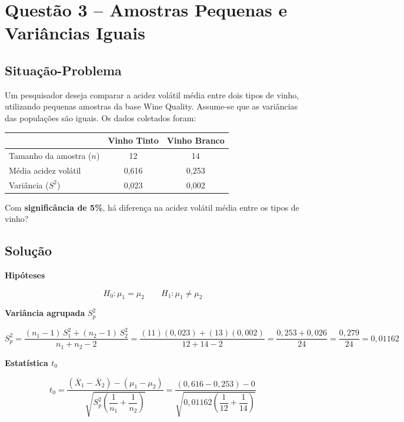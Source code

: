 \documentclass[12pt,a4paper]{article}
\begin{document}
\newpage

\section*{Questão 3 -- Amostras Pequenas e Variâncias Iguais}

\subsection*{Situação-Problema}

Um pesquisador deseja comparar a acidez volátil média entre dois tipos de vinho,
utilizando pequenas amostras da base Wine Quality. Assume-se que as variâncias
das populações são iguais. Os dados coletados foram:

\begin{center}
\begin{tabular}{lcc}
  \toprule
  & \textbf{Vinho Tinto} & \textbf{Vinho Branco} \\
  \midrule
  Tamanho da amostra ($n$) & 12       & 14       \\
  Média acidez volátil & 0{,}616  & 0{,}253  \\
  Variância ($S^2$)    & 0{,}023  & 0{,}002  \\
  \bottomrule
\end{tabular}
\end{center}

Com \textbf{significância de 5\%}, há diferença na acidez volátil média entre os tipos de vinho?

\subsection*{Solução}

\textbf{Hipóteses}

\[
  H_0: \mu_1 = \mu_2 \qquad H_1: \mu_1 \neq \mu_2
\]

\textbf{Variância agrupada} $S_p^2$

\[
  S_p^2 = \frac{(n_1 - 1)\,S_1^2 + (n_2 - 1)\,S_2^2}{n_1 + n_2 - 2}
        = \frac{(11)(0{,}023) + (13)(0{,}002)}{12 + 14 - 2}
        = \frac{0{,}253 + 0{,}026}{24}
        = \frac{0{,}279}{24}
        = 0{,}01162
\]

\textbf{Estatística $t_0$}

\[
  t_0 = \frac{(\bar{X}_1 - \bar{X}_2) - (\mu_1 - \mu_2)}
             {\sqrt{S_p^2 \left(\dfrac{1}{n_1} + \dfrac{1}{n_2}\right)}}
      = \frac{(0{,}616 - 0{,}253) - 0}
             {\sqrt{0{,}01162 \left(\dfrac{1}{12} + \dfrac{1}{14}\right)}}
\]
\end{document}
